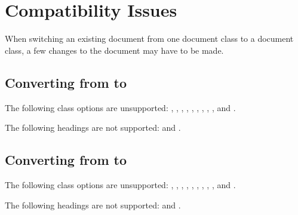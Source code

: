
\chapter{Compatibility Issues}
\label{ch:compatibility}

When switching an existing document from one document class to a \TL document class, a few changes to the document may have to be made.

\section{Converting from  to }

The following  class options are unsupported: \docclsopt{10pt}, \docclsopt{11pt}, \docclsopt{12pt}, , , , , , , and .

The following headings are not supported:  and .

\section{Converting from  to }

The following  class options are unsupported: \docclsopt{10pt}, \docclsopt{11pt}, \docclsopt{12pt}, , , , , , , and .

The following headings are not supported:  and .
